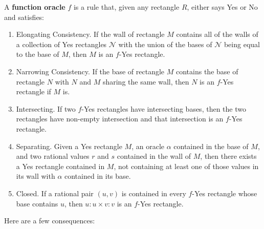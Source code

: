 \documentclass[12pt]{article}
\begin{document}
A \textbf{function oracle} $f$ is a rule that, given any rectangle $R$, either says Yes or No and satisfies: 
\begin{enumerate}
    \item Elongating Consistency. If the wall of rectangle $M$ contains all of the walls of a collection of Yes rectangles $\mathcal{N}$ with the union of the bases of $\mathcal{N}$ being equal to the base of $M$, then $M$ is an $f$-Yes rectangle.
    \item Narrowing Consistency. If the base of rectangle $M$ contains the base of rectangle $N$ with $N$ and $M$ sharing the same wall, then $N$ is an $f$-Yes rectangle if $M$ is. 
    \item Intersecting. If two $f$-Yes rectangles have intersecting bases, then the two rectangles have non-empty intersection and that intersection is an $f$-Yes rectangle. 
    \item Separating.  Given a Yes rectangle $M$, an oracle $\alpha$ contained in the base of $M$, and two rational values $r$ and $s$ contained in the wall of $M$, then there exists a Yes rectangle contained in $M$, not containing at least one of those values in its wall with $\alpha$ contained in its base.
    \item Closed. If a rational pair $(u,v)$ is contained in every $f$-Yes rectangle whose base contains $u$, then $u:u \times v:v$ is an $f$-Yes rectangle. 
\end{enumerate} 

Here are a few consequences: 
\end{document}
